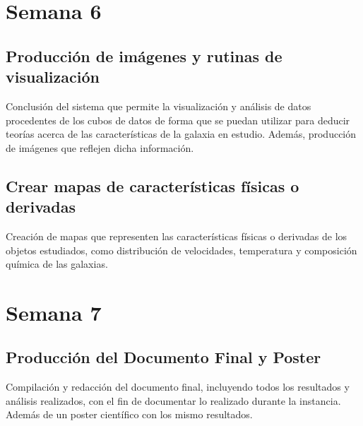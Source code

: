 \documentclass[12pt]{article}
\begin{document}
\section*{Semana 6}
\subsection*{Producción de imágenes y rutinas de visualización}
Conclusión del sistema que permite la visualización y análisis de datos procedentes de los cubos de datos de forma que se puedan utilizar para deducir teorías acerca de las características de la galaxia en estudio. Además, producción de imágenes que reflejen dicha información.

\subsection*{Crear mapas de características físicas o derivadas}
Creación de mapas que representen las características físicas o derivadas de los objetos estudiados, como distribución de velocidades, temperatura y composición química de las galaxias.

\section*{Semana 7}
\subsection*{Producción del Documento Final y Poster}
Compilación y redacción del documento final, incluyendo todos los resultados y análisis realizados, con el fin de documentar lo realizado durante la instancia. Además de un poster científico con los mismo resultados.
\end{document}
